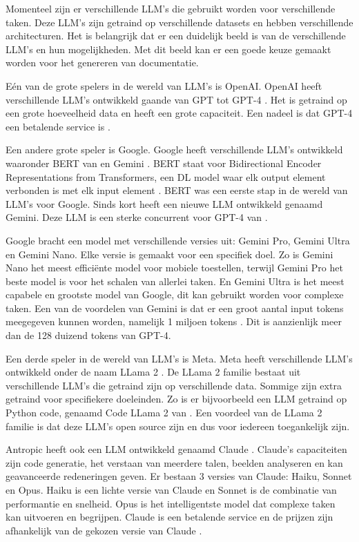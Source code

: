 Momenteel zijn er verschillende LLM's die gebruikt worden voor verschillende taken.
Deze LLM's zijn getraind op verschillende datasets en hebben verschillende architecturen.
Het is belangrijk dat er een duidelijk beeld is van de verschillende LLM's en hun mogelijkheden. 
Met dit beeld kan er een goede keuze gemaakt worden voor het genereren van documentatie.

Eén van de grote spelers in de wereld van LLM's is OpenAI. OpenAI heeft verschillende LLM's ontwikkeld gaande van GPT \autocite{RandfordEtAL2018} tot GPT-4 \autocite{OpenAI2023}.
Het is getraind op een grote hoeveelheid data en heeft een grote capaciteit.
Een nadeel is dat GPT-4 een betalende service is \autocite{OpenAI2023}.

Een andere grote speler is Google. Google heeft verschillende LLM's ontwikkeld waaronder BERT van \textcite{DevlinEtAl2019} en Gemini \autocite{Google2024}.
BERT staat voor Bidirectional Encoder Representations from Transformers, een DL model waar elk output element verbonden is met elk input element \autocite{HashemiPour2024}.
BERT was een eerste stap in de wereld van LLM's voor Google. Sinds kort heeft \textcite{Google2024} een nieuwe LLM ontwikkeld genaamd Gemini.
Deze LLM is een sterke concurrent voor GPT-4 van \textcite{OpenAI2023}. 

Google \autocite{Google2024} bracht een model met verschillende versies uit: Gemini Pro, Gemini Ultra en Gemini Nano. 
Elke versie is gemaakt voor een specifiek doel. Zo is Gemini Nano het meest efficiënte model voor mobiele toestellen, terwijl Gemini Pro het beste model is voor het schalen van allerlei taken.
En Gemini Ultra is het meest capabele en grootste model van Google, dit kan gebruikt worden voor complexe taken.
Een van de voordelen van Gemini is dat er een groot aantal input tokens meegegeven kunnen worden, namelijk 1 miljoen tokens \autocite{Google2024}.
Dit is aanzienlijk meer dan de 128 duizend tokens van GPT-4.

Een derde speler in de wereld van LLM's is Meta. Meta heeft verschillende LLM's ontwikkeld onder de naam LLama 2 \autocite{Meta2024}.
De LLama 2 familie bestaat uit verschillende LLM's die getraind zijn op verschillende data. Sommige zijn extra getraind voor specifiekere doeleinden.
Zo is er bijvoorbeeld een LLM getraind op Python code, genaamd Code LLama 2 van \textcite{Roziere2024}.
Een voordeel van de LLama 2 familie is dat deze LLM's open source zijn en dus voor iedereen toegankelijk zijn.

Antropic heeft ook een LLM ontwikkeld genaamd Claude \autocite{Anthropic2023}. 
Claude's capaciteiten zijn code generatie, het verstaan van meerdere talen, beelden analyseren en kan geavanceerde redeneringen geven.
Er bestaan 3 versies van Claude: Haiku, Sonnet en Opus.
Haiku is een lichte versie van Claude en Sonnet is de combinatie van performantie en snelheid. Opus is het intelligentste model dat complexe taken kan uitvoeren en begrijpen.
Claude is een betalende service en de prijzen zijn afhankelijk van de gekozen versie van Claude \autocite{Anthropic2023}.

